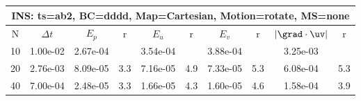 
\begin{tabular}{|c|c|c|c|c|c|c|c|c|c|} \hline
 \multicolumn{10}{|c|}{INS: ts=ab2, BC=dddd, Map=Cartesian, Motion=rotate, MS=none } \\ \hline 
     N  &   $\Delta t$ & $E_p$   &  r  &   $E_u$   &   r    &   $E_v$   & r   &  $|\grad\cdot\uv|$  & r   \\ \hline 
  10   &  1.00e-02  &   2.67e-04  &        &   3.54e-04  &        &   3.88e-04  &        &   3.25e-03  &        \\ 
  20   &  2.76e-03  &   8.09e-05  & 3.3  &   7.16e-05  & 4.9  &   7.33e-05  & 5.3  &   6.08e-04  & 5.3  \\ 
  40   &  7.00e-04  &   2.48e-05  & 3.3  &   1.66e-05  & 4.3  &   1.60e-05  & 4.6  &   1.58e-04  & 3.9  \\ 
 \hline 
\end{tabular}
